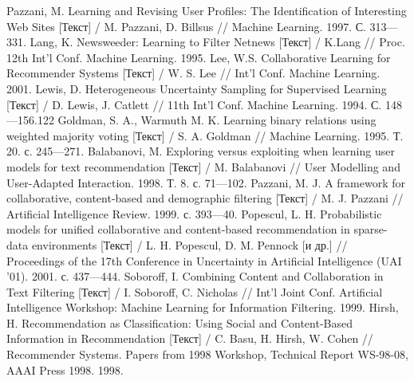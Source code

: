 \begin{thebibliography}{119}
 Pazzani, M. Learning and Revising User Profiles: The Identification of
Interesting Web Sites  [Текст] / M. Pazzani, D. Billsus // Machine Learning. 1997. С. 313---331.
 Lang, K. Newsweeder: Learning to Filter Netnews  [Текст] / K.Lang // Proc. 12th Int’l Conf.
Machine Learning. 1995.
 Lee, W.S. Collaborative Learning for Recommender Systems  [Текст] / W. S. Lee // Int’l Conf.
Machine Learning. 2001.
 Lewis, D. Heterogeneous Uncertainty Sampling for Supervised
Learning  [Текст] /  D. Lewis, J. Catlett // 11th Int’l Conf. Machine Learning. 1994. С. 148---156.122
 Goldman, S. A., Warmuth M. K. Learning binary relations using weighted majority
voting  [Текст] / S. A. Goldman // Machine Learning. 1995. Т. 20. с. 245---271.
 Balabanovi, M. Exploring versus exploiting when learning user models for text
recommendation  [Текст] / M. Balabanovi // User Modelling and User-Adapted Interaction. 1998. Т. 8.
с. 71---102.
 Pazzani, M. J. A framework for collaborative, content-based and demographic
filtering  [Текст] / M. J. Pazzani // Artificial Intelligence Review. 1999. с. 393---40.
 Popescul, L. H. Probabilistic models for unified collaborative and content-based recommendation
in sparse-data environments  [Текст] / L. H. Popescul, D. M. Pennock [и др.] //
Proceedings of the 17th Conference in Uncertainty in Artificial Intelligence (UAI
’01). 2001. с. 437---444.
 Soboroff, I. Combining Content and Collaboration in Text Filtering [Текст] / I. Soboroff, C. Nicholas //
Int’l Joint Conf. Artificial Intelligence Workshop: Machine Learning for
Information Filtering. 1999.
 Hirsh, H. Recommendation as Classification: Using Social
and Content-Based Information in Recommendation  [Текст] / C. Basu, H. Hirsh, W. Cohen // Recommender Systems.
Papers from 1998 Workshop, Technical Report WS-98-08, AAAI Press 1998.
1998.




\end{thebibliography}
